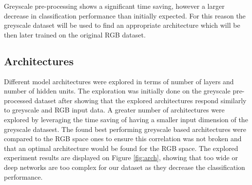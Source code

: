 \documentclass[12pt]{article}
\begin{document}
Greyscale pre-processing shows a significant time saving, however a larger decrease in classification performance than initially expected. For this reason the greyscale dataset will be used to find an appropriate architecture which will be then later trained on the original RGB dataset.

\subsection*{Architectures}

Different model architectures were explored in terms of number of layers and number of hidden units. The exploration was initially done on the greyscale pre-processed dataset after showing that the explored architectures respond similarly to greyscale and RGB input data. A greater number of architectures were explored by leveraging the time saving of having a smaller input dimension of the greyscale datasest. The found best performing greyscale based architectures were compared to the RGB space ones to ensure this correlation was not broken and that an optimal architecture would be found for the RGB space. The explored experiment results are displayed on Figure \ref{fig:arch}, showing that too wide or deep networks are too complex for our dataset as they decrease the classification performance.
\end{document}
